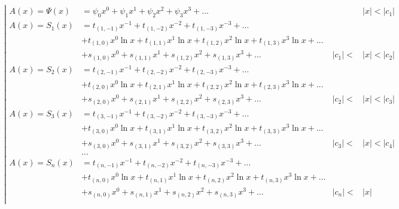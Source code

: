 \begin{equation*} \left| \begin{aligned}
A(x) = \Psi(x) &=
  \psi_0 x^0
+ \psi_1 x^1
+ \psi_2 x^2
+ \psi_3 x^3
+ \ldots &
&|x| < |c_1| \\
%
A(x) = S_1(x) &= 
  t_{(1,-1)} x^{-1}
+ t_{(1,-2)} x^{-2}
+ t_{(1,-3)} x^{-3}
+ \ldots \\ &
+ t_{(1,0)} x^0 \ln{x}
+ t_{(1,1)} x^1 \ln{x}
+ t_{(1,2)} x^2 \ln{x}
+ t_{(1,3)} x^3 \ln{x}
+ \ldots \\ &
+ s_{(1,0)} x^0
+ s_{(1,1)} x^1
+ s_{(1,2)} x^2
+ s_{(1,3)} x^3
+ \ldots &
|c_1| < &|x| < |c_2| \\
%
A(x) = S_2(x) &= 
  t_{(2,-1)} x^{-1}
+ t_{(2,-2)} x^{-2}
+ t_{(2,-3)} x^{-3}
+ \ldots \\ &
+ t_{(2,0)} x^0 \ln{x}
+ t_{(2,1)} x^1 \ln{x}
+ t_{(2,2)} x^2 \ln{x}
+ t_{(2,3)} x^3 \ln{x}
+ \ldots \\ &
+ s_{(2,0)} x^0
+ s_{(2,1)} x^1
+ s_{(2,2)} x^2
+ s_{(2,3)} x^3
+ \ldots &
|c_2| < &|x| < |c_3| \\
%
A(x) = S_3(x) &= 
  t_{(3,-1)} x^{-1}
+ t_{(3,-2)} x^{-2}
+ t_{(3,-3)} x^{-3}
+ \ldots \\ &
+ t_{(3,0)} x^0 \ln{x}
+ t_{(3,1)} x^1 \ln{x}
+ t_{(3,2)} x^2 \ln{x}
+ t_{(3,3)} x^3 \ln{x}
+ \ldots \\ &
+ s_{(3,0)} x^0
+ s_{(3,1)} x^1
+ s_{(3,2)} x^2
+ s_{(3,3)} x^3
+ \ldots &
|c_3| < &|x| < |c_4| \\
%
&\ldots \\
%
A(x) = S_n(x) &= 
  t_{(n,-1)} x^{-1}
+ t_{(n,-2)} x^{-2}
+ t_{(n,-3)} x^{-3}
+ \ldots \\ &
+ t_{(n,0)} x^0 \ln{x}
+ t_{(n,1)} x^1 \ln{x}
+ t_{(n,2)} x^2 \ln{x}
+ t_{(n,3)} x^3 \ln{x}
+ \ldots \\ &
+ s_{(n,0)} x^0
+ s_{(n,1)} x^1
+ s_{(n,2)} x^2
+ s_{(n,3)} x^3
+ \ldots &
|c_n| < &|x| \\
\end{aligned} \right. \end{equation*}

